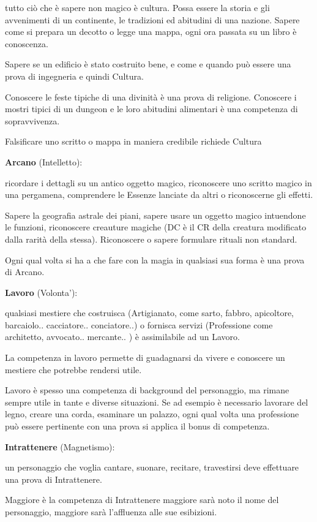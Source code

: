 \documentclass[a4paper,11pt,twoside,openany]{book}
\begin{document}
tutto ciò che è sapere non magico è cultura. Possa essere la storia e gli avvenimenti di un continente, le tradizioni ed abitudini di una nazione. Sapere come si prepara un decotto o legge una mappa, ogni ora passata su un libro è conoscenza.

Sapere se un edificio è stato costruito bene, e come e quando può essere una prova di ingegneria e quindi Cultura.

Conoscere le feste tipiche di una divinità è una prova di religione. Conoscere i mostri tipici di un dungeon e le loro abitudini alimentari è una competenza di sopravvivenza.

Falsificare uno scritto o mappa in maniera credibile richiede Cultura

\textbf{Arcano} (Intelletto):

ricordare i dettagli su un antico oggetto magico, riconoscere uno scritto magico in una pergamena, comprendere le Essenze lanciate da altri o riconoscerne gli effetti.

Sapere la geografia astrale dei piani, sapere usare un oggetto magico intuendone le funzioni, riconoscere creauture magiche (DC è il CR della creatura modificato dalla rarità della stessa). Riconoscere o sapere formulare rituali non standard.

Ogni qual volta si ha a che fare con la magia in qualsiasi sua forma è una prova di Arcano.

\textbf{Lavoro} (Volonta'):

qualsiasi mestiere che costruisca (Artigianato, come sarto, fabbro, apicoltore, barcaiolo.. cacciatore.. conciatore..) o fornisca servizi (Professione come architetto, avvocato.. mercante.. ) è assimilabile ad un Lavoro.

La competenza in lavoro permette di guadagnarsi da vivere e conoscere un mestiere che potrebbe rendersi utile.

Lavoro è spesso una competenza di background del personaggio, ma rimane sempre utile in tante e diverse situazioni. Se ad esempio è necessario lavorare del legno, creare una corda, esaminare un palazzo, ogni qual volta una professione può essere pertinente con una prova si applica il bonus di competenza.

\textbf{Intrattenere} (Magnetismo):

un personaggio che voglia cantare, suonare, recitare, travestirsi deve effettuare una prova di Intrattenere.

Maggiore è la competenza di Intrattenere maggiore sarà noto il nome del personaggio, maggiore sarà l'affluenza alle sue esibizioni.
\end{document}
